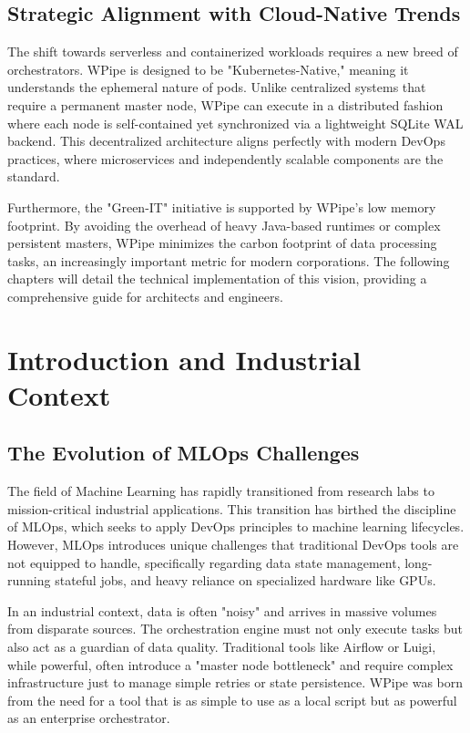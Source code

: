 \documentclass[12pt,a4paper]{report}
\begin{document}
\cleardoublepage
\section{Strategic Alignment with Cloud-Native Trends}
The shift towards serverless and containerized workloads requires a new breed of orchestrators. WPipe is designed to be "Kubernetes-Native," meaning it understands the ephemeral nature of pods. Unlike centralized systems that require a permanent master node, WPipe can execute in a distributed fashion where each node is self-contained yet synchronized via a lightweight SQLite WAL backend. This decentralized architecture aligns perfectly with modern DevOps practices, where microservices and independently scalable components are the standard.

Furthermore, the "Green-IT" initiative is supported by WPipe's low memory footprint. By avoiding the overhead of heavy Java-based runtimes or complex persistent masters, WPipe minimizes the carbon footprint of data processing tasks, an increasingly important metric for modern corporations. The following chapters will detail the technical implementation of this vision, providing a comprehensive guide for architects and engineers.

\chapter{Introduction and Industrial Context}
\cleardoublepage

\section{The Evolution of MLOps Challenges}
The field of Machine Learning has rapidly transitioned from research labs to mission-critical industrial applications. This transition has birthed the discipline of MLOps, which seeks to apply DevOps principles to machine learning lifecycles. However, MLOps introduces unique challenges that traditional DevOps tools are not equipped to handle, specifically regarding data state management, long-running stateful jobs, and heavy reliance on specialized hardware like GPUs.

In an industrial context, data is often "noisy" and arrives in massive volumes from disparate sources. The orchestration engine must not only execute tasks but also act as a guardian of data quality. Traditional tools like Airflow or Luigi, while powerful, often introduce a "master node bottleneck" and require complex infrastructure just to manage simple retries or state persistence. WPipe was born from the need for a tool that is as simple to use as a local script but as powerful as an enterprise orchestrator.
\end{document}
